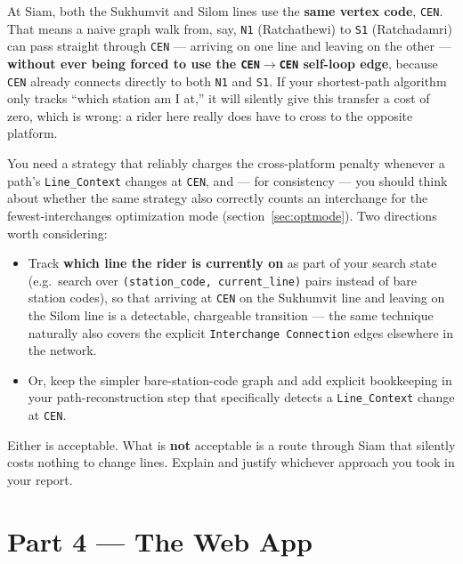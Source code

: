 \documentclass[11pt,a4paper]{article}
\begin{document}
\begin{gotcha}
At Siam, both the Sukhumvit and Silom lines use the \textbf{same vertex
code}, \texttt{CEN}. That means a naive graph walk from, say, \texttt{N1}
(Ratchathewi) to \texttt{S1} (Ratchadamri) can pass straight through
\texttt{CEN} --- arriving on one line and leaving on the other --- \textbf{without
ever being forced to use the \texttt{CEN}$\to$\texttt{CEN} self-loop edge},
because \texttt{CEN} already connects directly to both \texttt{N1} and
\texttt{S1}. If your shortest-path algorithm only tracks ``which station am
I at,'' it will silently give this transfer a cost of zero, which is wrong:
a rider here really does have to cross to the opposite platform.

You need a strategy that reliably charges the cross-platform penalty
whenever a path's \texttt{Line\_Context} changes at \texttt{CEN}, and ---
for consistency --- you should think about whether the same strategy also
correctly counts an interchange for the fewest-interchanges optimization
mode (section~\ref{sec:optmode}). Two directions worth considering:
\begin{itemize}
  \item Track \textbf{which line the rider is currently on} as part of your
        search state (e.g.\ search over \texttt{(station\_code,
        current\_line)} pairs instead of bare station codes), so that
        arriving at \texttt{CEN} on the Sukhumvit line and leaving on the
        Silom line is a detectable, chargeable transition --- the same
        technique naturally also covers the explicit \texttt{Interchange
        Connection} edges elsewhere in the network.
  \item Or, keep the simpler bare-station-code graph and add explicit
        bookkeeping in your path-reconstruction step that specifically
        detects a \texttt{Line\_Context} change at \texttt{CEN}.
\end{itemize}
Either is acceptable. What is \textbf{not} acceptable is a route through
Siam that silently costs nothing to change lines. Explain and justify
whichever approach you took in your report.
\end{gotcha}

\section{Part 4 --- The Web App}
\end{document}
